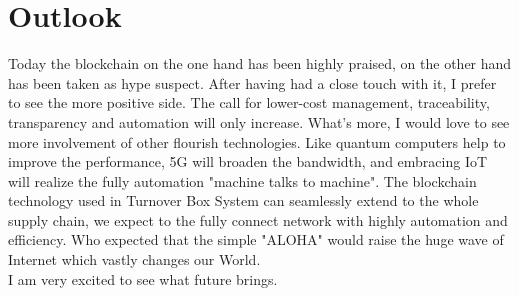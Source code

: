 \section{Outlook}
Today the blockchain on the one hand has been highly praised, on the other hand has been taken as hype suspect. After having had a close touch with it, I prefer to see the more positive side. The call for lower-cost management, traceability, transparency and automation will only increase. What's more, I would love to see more involvement of other flourish technologies. Like quantum computers help to improve the performance, 5G will broaden the bandwidth, and embracing IoT will realize the fully automation "machine talks to machine". The blockchain technology used in Turnover Box System can seamlessly extend to the whole supply chain, we expect to the fully connect network with highly automation and efficiency. 
Who expected that the simple "ALOHA" would raise the huge wave of Internet which vastly changes our World. \\


I am very excited to see what future brings. 


